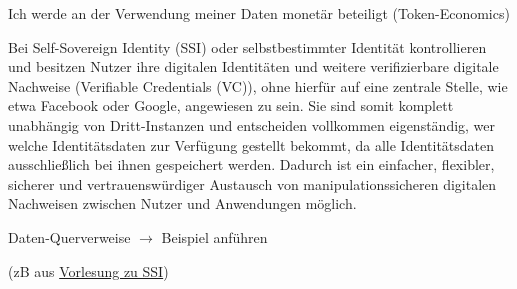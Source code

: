 \vspace{0.3cm}


\begin{Solution}

Ich werde an der Verwendung meiner Daten monetär beteiligt (Token-Economics)

\end{Solution}

\vspace{0.3cm}


\begin{Solution}

Bei Self-Sovereign Identity (SSI) oder selbstbestimmter Identität kontrollieren und besitzen Nutzer ihre digitalen Identitäten und weitere verifizierbare digitale Nachweise (Verifiable Credentials (VC)), ohne hierfür auf eine zentrale Stelle, wie etwa Facebook oder Google, angewiesen zu sein. Sie sind somit komplett unabhängig von Dritt-Instanzen und entscheiden vollkommen eigenständig, wer welche Identitätsdaten zur Verfügung gestellt bekommt, da alle Identitätsdaten ausschließlich bei ihnen gespeichert werden. Dadurch ist ein einfacher, flexibler, sicherer und vertrauenswürdiger Austausch von manipulationssicheren digitalen Nachweisen zwischen Nutzer und Anwendungen möglich.

\end{Solution}

\vspace{0.3cm}


\begin{Solution}

Daten-Querverweise $\rightarrow$ Beispiel anführen 

(zB aus \href{https://norbert-pohlmann.com/glossar-cyber-sicherheit/self-sovereign-identity-ssi/}{Vorlesung zu SSI})

\end{Solution}

\vspace{0.5cm}